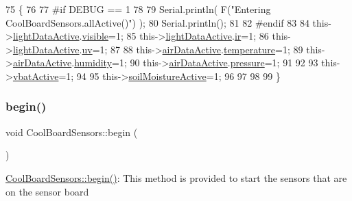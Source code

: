 \begin{DoxyCode}
75 \{
76 
77 \textcolor{preprocessor}{#if DEBUG == 1 }
78 
79     Serial.println( F(\textcolor{stringliteral}{"Entering CoolBoardSensors.allActive()"}) );
80     Serial.println();
81 
82 \textcolor{preprocessor}{#endif}
83     
84     this->\hyperlink{class_cool_board_sensors_ac4deb1cf41bac8b91c780c92fab00ba4}{lightDataActive}.\hyperlink{struct_cool_board_sensors_1_1light_active_a9c351100969d0dc055ad2e6712cc7ac8}{visible}=1;
85     this->\hyperlink{class_cool_board_sensors_ac4deb1cf41bac8b91c780c92fab00ba4}{lightDataActive}.\hyperlink{struct_cool_board_sensors_1_1light_active_a4c21258d3c89c6292740d6deb10f9dcc}{ir}=1;
86     this->\hyperlink{class_cool_board_sensors_ac4deb1cf41bac8b91c780c92fab00ba4}{lightDataActive}.\hyperlink{struct_cool_board_sensors_1_1light_active_a0e6cfc311425a31f32c32fc3b834ffb8}{uv}=1;    
87 
88     this->\hyperlink{class_cool_board_sensors_abff8dfeccb2f7689847bb64d5f1cd31e}{airDataActive}.\hyperlink{struct_cool_board_sensors_1_1air_active_ac08576736c7ac3bfbfec32e5ee17c686}{temperature}=1;
89     this->\hyperlink{class_cool_board_sensors_abff8dfeccb2f7689847bb64d5f1cd31e}{airDataActive}.\hyperlink{struct_cool_board_sensors_1_1air_active_ab69738e9fd1c2ba80dc666bcd1e116f7}{humidity}=1;
90     this->\hyperlink{class_cool_board_sensors_abff8dfeccb2f7689847bb64d5f1cd31e}{airDataActive}.\hyperlink{struct_cool_board_sensors_1_1air_active_a15932ccfb6ee6603713d937ec9b76b72}{pressure}=1;
91 
92 
93     this->\hyperlink{class_cool_board_sensors_ab0b4bbae83796b52b90f91008d383583}{vbatActive}=1;
94 
95     this->\hyperlink{class_cool_board_sensors_ae7971bf527781ac4994309591b78ab89}{soilMoistureActive}=1;
96     
97 
98 
99 \}
\end{DoxyCode}
\mbox{\label{class_cool_board_sensors_a97095823ef7c8f5290812f1405b966b3}} 
\subsubsection{\texorpdfstring{begin()}{begin()}}
{\footnotesize\ttfamily void Cool\+Board\+Sensors\+::begin (\begin{DoxyParamCaption}{ }\end{DoxyParamCaption})}

\hyperlink{class_cool_board_sensors_a97095823ef7c8f5290812f1405b966b3}{Cool\+Board\+Sensors\+::begin()}\+: This method is provided to start the sensors that are on the sensor board 

